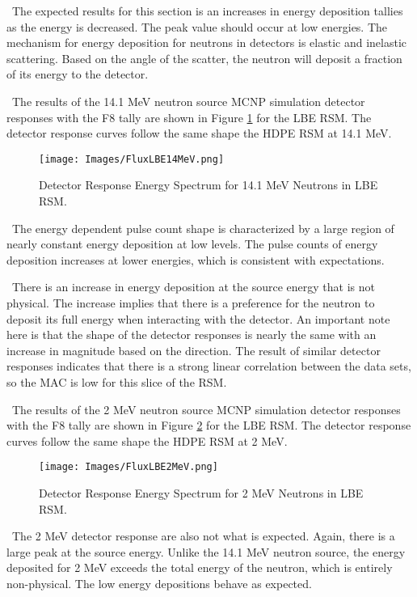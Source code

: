 \documentclass[journal]{IEEEtran}
\let\MYoriglatexcaption\caption
\renewcommand{\caption}[2][\relax]{\MYoriglatexcaption[#2]{#2}}
\begin{document}
    \ The expected results for this section is an increases in energy deposition tallies as the energy is decreased.  The peak value should occur at low energies.  The mechanism for energy deposition for neutrons in detectors is elastic and inelastic scattering.  Based on the angle of the scatter, the neutron will deposit a fraction of its energy to the detector.  
    
    \ The results of the 14.1 MeV neutron source MCNP simulation detector responses with the F8 tally are shown in Figure \ref{fig:ESpec} for the LBE RSM. The detector response curves follow the same shape the HDPE RSM at 14.1 MeV.  
	
	\begin{figure}[ht]
		\texttt{[image: Images/FluxLBE14MeV.png]}
		\centering
		\caption{Detector Response Energy Spectrum for 14.1 MeV Neutrons in LBE RSM.}
		\label{fig:ESpec}
	\end{figure}
	
	\ The energy dependent pulse count shape is characterized by a large region of nearly constant energy deposition at low levels.  The pulse counts of energy deposition increases at lower energies, which is consistent with expectations. 
	
	\ There is an increase in energy deposition at the source energy that is not physical.  The increase implies that there is a preference for the neutron to deposit its full energy when interacting with the detector.  An important note here is that the shape of the detector responses is nearly the same with an increase in magnitude based on the direction.  The result of similar detector responses indicates that there is a strong linear correlation between the data sets, so the MAC is low for this slice of the RSM. 
	
    \ The results of the 2 MeV neutron source MCNP simulation detector responses with the F8 tally are shown in Figure \ref{fig:ESpec2} for the LBE RSM. The detector response curves follow the same shape the HDPE RSM at 2 MeV.  
	
	\begin{figure}[ht]
		\texttt{[image: Images/FluxLBE2MeV.png]}
		\centering
		\caption{Detector Response Energy Spectrum for 2 MeV Neutrons in LBE RSM.}
		\label{fig:ESpec2}
	\end{figure}

    \ The 2 MeV detector response are also not what is expected.  Again, there is a large peak at the source energy.  Unlike the 14.1 MeV neutron source, the energy deposited for 2 MeV exceeds the total energy of the neutron, which is entirely non-physical.  The low energy depositions behave as expected. 
	
\end{document}
